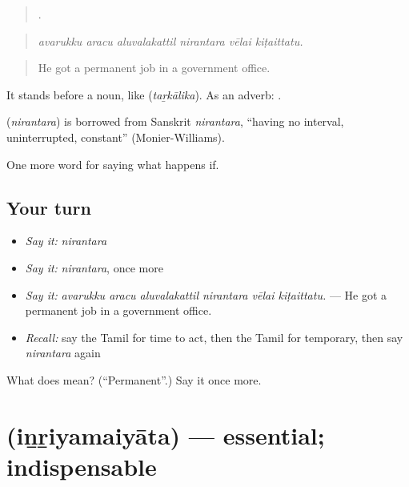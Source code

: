 \begin{quote}
     .
\end{quote}

\begin{quote}
\emph{avarukku aracu aluvalakattil nirantara vēlai kiṭaittatu.}
\end{quote}

\begin{quote}
He got a permanent job in a government office.
\end{quote}

It stands before a noun, like  (\emph{taṟkālika}). As an adverb: .

\begin{cousinweb}
\textbf{} (\emph{nirantara}) is borrowed from Sanskrit \emph{nirantara}, \textquotedblleft{}having no interval, uninterrupted, constant\textquotedblright{} (Monier-Williams).
\end{cousinweb}

\begin{grammarlens}[title={What you've built}]
One more word for saying what happens if.
\end{grammarlens}

\subsection*{Your turn}
\begin{itemize}
\raggedright
  \item \emph{Say it:} \emph{nirantara}
  \item \emph{Say it:} \emph{nirantara}, once more
  \item \emph{Say it:} \emph{avarukku aracu aluvalakattil nirantara vēlai kiṭaittatu.} — He got a permanent job in a government office.
  \item \emph{Recall:} say the Tamil for time to act, then the Tamil for temporary, then say \emph{nirantara} again
\end{itemize}

\begin{tcolorbox}[breakable,colback=teal!4,colframe=teal!35!black,title={Before you move on}]
What does  mean? (\textquotedblleft{}Permanent\textquotedblright{}.) Say it once more.
\end{tcolorbox}
\section[\texorpdfstring{\ta{இன்றியமையாத} (iṉṟiyamaiyāta)}{இன்றியமையாத (iṉṟiyamaiyāta)}]{ (iṉṟiyamaiyāta) — essential; indispensable}

